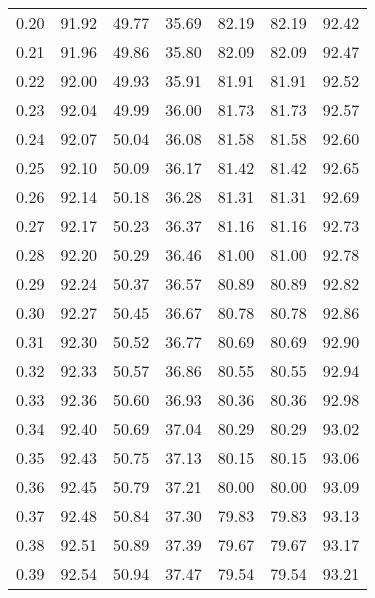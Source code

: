 \begin{tabular}{|c|c|c|c|c|c|c|}
      0.20 &     91.92 &     49.77 &      35.69 &   82.19 &      82.19 &         92.42 \\
      0.21 &     91.96 &     49.86 &      35.80 &   82.09 &      82.09 &         92.47 \\
      0.22 &     92.00 &     49.93 &      35.91 &   81.91 &      81.91 &         92.52 \\
      0.23 &     92.04 &     49.99 &      36.00 &   81.73 &      81.73 &         92.57 \\
      0.24 &     92.07 &     50.04 &      36.08 &   81.58 &      81.58 &         92.60 \\
      0.25 &     92.10 &     50.09 &      36.17 &   81.42 &      81.42 &         92.65 \\
      0.26 &     92.14 &     50.18 &      36.28 &   81.31 &      81.31 &         92.69 \\
      0.27 &     92.17 &     50.23 &      36.37 &   81.16 &      81.16 &         92.73 \\
      0.28 &     92.20 &     50.29 &      36.46 &   81.00 &      81.00 &         92.78 \\
      0.29 &     92.24 &     50.37 &      36.57 &   80.89 &      80.89 &         92.82 \\
      0.30 &     92.27 &     50.45 &      36.67 &   80.78 &      80.78 &         92.86 \\
      0.31 &     92.30 &     50.52 &      36.77 &   80.69 &      80.69 &         92.90 \\
      0.32 &     92.33 &     50.57 &      36.86 &   80.55 &      80.55 &         92.94 \\
      0.33 &     92.36 &     50.60 &      36.93 &   80.36 &      80.36 &         92.98 \\
      0.34 &     92.40 &     50.69 &      37.04 &   80.29 &      80.29 &         93.02 \\
      0.35 &     92.43 &     50.75 &      37.13 &   80.15 &      80.15 &         93.06 \\
      0.36 &     92.45 &     50.79 &      37.21 &   80.00 &      80.00 &         93.09 \\
      0.37 &     92.48 &     50.84 &      37.30 &   79.83 &      79.83 &         93.13 \\
      0.38 &     92.51 &     50.89 &      37.39 &   79.67 &      79.67 &         93.17 \\
      0.39 &     92.54 &     50.94 &      37.47 &   79.54 &      79.54 &         93.21 \\

\end{tabular}
